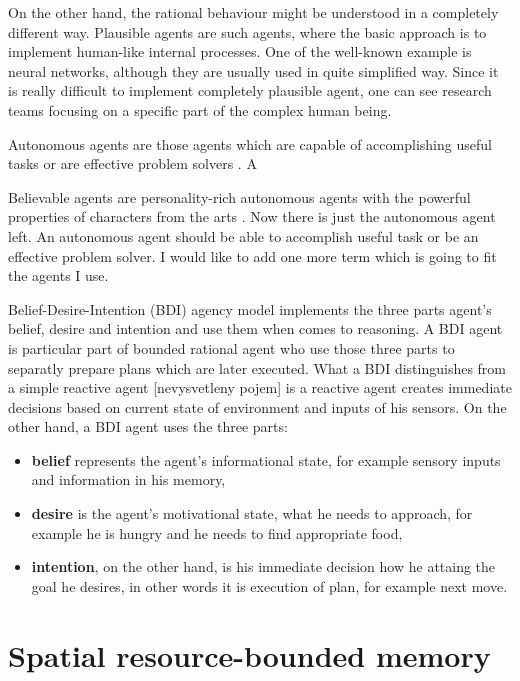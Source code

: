 On the other hand, the rational behaviour might be understood in a completely different way. Plausible agents are such agents, where the basic approach is to implement human-like internal processes. One of the well-known example is neural networks, although they are usually used in quite simplified way. Since it is really difficult to implement completely plausible agent, one can see research teams focusing on a specific part of the complex human being. 

Autonomous agents are those agents which are capable of accomplishing useful tasks or are effective problem solvers \cite{Loyall:believableagents}. A

Believable agents are personality-rich autonomous agents with the powerful properties of characters from the arts \cite{Loyall:believableagents}. Now there is just the autonomous agent left. An autonomous agent should be able to accomplish useful task or be an effective problem solver. I would like to add one more term which is going to fit the agents I use. 

Belief-Desire-Intention (BDI) agency model implements the three parts agent's belief, desire and intention and use them when comes to reasoning. A BDI agent is particular part of bounded rational agent who use those three parts to separatly prepare plans which are later executed. What a BDI distinguishes from a simple reactive agent [nevysvetleny pojem] is a reactive agent creates immediate decisions based on current state of environment and inputs of his sensors. On the other hand, a BDI agent uses the three parts:

\begin{itemize}
\item {\bf belief} represents the agent's informational state, for example sensory inputs and information in his memory,
\item {\bf desire} is the agent's motivational state, what he needs to approach, for example he is hungry and he needs to find appropriate food,
\item {\bf intention}, on the other hand, is his immediate decision how he attaing the goal he desires, in other words it is execution of plan, for example next move.
\end{itemize}

\section{Spatial resource-bounded memory}


